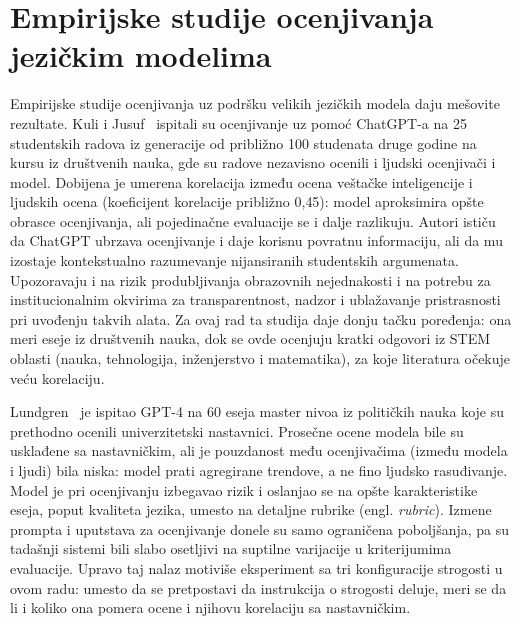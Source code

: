 \section{Empirijske studije ocenjivanja jezičkim modelima}
\label{sec:empirijske-studije}

Empirijske studije ocenjivanja uz podršku velikih jezičkih modela daju mešovite rezultate.
Kuli i Jusuf~\cite{kooli2025transforming} ispitali su ocenjivanje uz pomoć ChatGPT-a na 25 studentskih radova
iz generacije od približno 100 studenata druge godine na kursu iz društvenih nauka,
gde su radove nezavisno ocenili i ljudski ocenjivači i model.
Dobijena je umerena korelacija između ocena veštačke inteligencije i ljudskih ocena (koeficijent korelacije približno 0{,}45):
model aproksimira opšte obrasce ocenjivanja,
ali pojedinačne evaluacije se i dalje razlikuju.
Autori ističu da ChatGPT ubrzava ocenjivanje i daje korisnu povratnu informaciju,
ali da mu izostaje kontekstualno razumevanje nijansiranih studentskih argumenata.
Upozoravaju i na rizik produbljivanja obrazovnih nejednakosti i na potrebu za institucionalnim okvirima za transparentnost,
nadzor i ublažavanje pristrasnosti pri uvođenju takvih alata.
Za ovaj rad ta studija daje donju tačku poređenja:
ona meri eseje iz društvenih nauka, dok se ovde ocenjuju kratki odgovori iz STEM oblasti (nauka, tehnologija, inženjerstvo i matematika),
za koje literatura očekuje veću korelaciju.

Lundgren~\cite{lundgren2024large} je ispitao GPT-4 na 60 eseja master nivoa iz političkih nauka koje su prethodno ocenili univerzitetski nastavnici.
Prosečne ocene modela bile su usklađene sa nastavničkim, ali je pouzdanost među ocenjivačima (između modela i ljudi) bila niska:
model prati agregirane trendove, a ne fino ljudsko rasuđivanje.
Model je pri ocenjivanju izbegavao rizik i oslanjao se na opšte karakteristike eseja, poput kvaliteta jezika,
umesto na detaljne rubrike (engl. \emph{rubric}).
Izmene prompta i uputstava za ocenjivanje donele su samo ograničena poboljšanja,
pa su tadašnji sistemi bili slabo osetljivi na suptilne varijacije u kriterijumima evaluacije.
Upravo taj nalaz motiviše eksperiment sa tri konfiguracije strogosti u ovom radu:
umesto da se pretpostavi da instrukcija o strogosti deluje, meri se da li i koliko ona pomera ocene i njihovu korelaciju sa nastavničkim.

